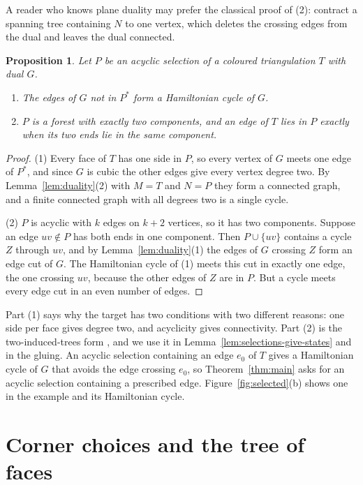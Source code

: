 \documentclass[10pt]{amsart}
\numberwithin{equation}{section}
\newtheorem{proposition}[equation]{Proposition}
\theoremstyle{definition}
\theoremstyle{remark}
\newcommand{\T}{T}
\begin{document}
A reader who knows plane duality may prefer the classical proof of (2): contract a spanning tree containing $N$ to one vertex, which deletes the crossing edges from the dual and leaves the dual connected.

\begin{proposition}\label{prop:target}
Let $P$ be an acyclic selection of a coloured triangulation $\T$ with dual $G$.
\begin{enumerate}
\item The edges of $G$ not in $P^*$ form a Hamiltonian cycle of $G$.
\item $P$ is a forest with exactly two components, and an edge of $\T$ lies in $P$ exactly when its two ends lie in the same component.
\end{enumerate}
\end{proposition}

\begin{proof}
(1) Every face of $\T$ has one side in $P$, so every vertex of $G$ meets one edge of $P^*$, and since $G$ is cubic the other edges give every vertex degree two.
By Lemma~\ref{lem:duality}(2) with $M=\T$ and $N=P$ they form a connected graph, and a finite connected graph with all degrees two is a single cycle.

(2) $P$ is acyclic with $k$ edges on $k+2$ vertices, so it has two components.
Suppose an edge $uv\notin P$ has both ends in one component.
Then $P\cup\{uv\}$ contains a cycle $Z$ through $uv$, and by Lemma~\ref{lem:duality}(1) the edges of $G$ crossing $Z$ form an edge cut of $G$.
The Hamiltonian cycle of (1) meets this cut in exactly one edge, the one crossing $uv$, because the other edges of $Z$ are in $P$.
But a cycle meets every edge cut in an even number of edges.
\end{proof}

Part (1) says why the target has two conditions with two different reasons: one side per face gives degree two, and acyclicity gives connectivity.
Part (2) is the two-induced-trees form \cite{stein1971,apsw2016}, and we use it in Lemma~\ref{lem:selections-give-states} and in the gluing.
An acyclic selection containing an edge $e_0$ of $\T$ gives a Hamiltonian cycle of $G$ that avoids the edge crossing $e_0$, so Theorem~\ref{thm:main} asks for an acyclic selection containing a prescribed edge.
Figure~\ref{fig:selected}(b) shows one in the example and its Hamiltonian cycle.

\section{Corner choices and the tree of faces}\label{sec:corners}
\end{document}
